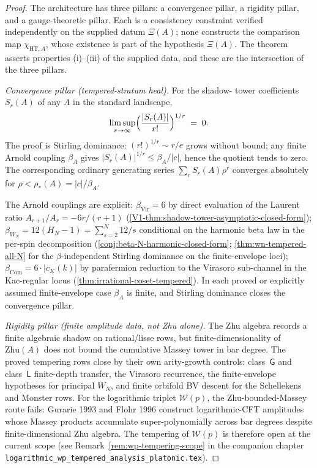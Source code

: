 \begin{proof}
The architecture has three pillars: a convergence pillar, a
rigidity pillar, and a gauge-theoretic pillar. Each is a consistency
constraint verified independently on the supplied datum \(\Xi(A)\);
none constructs the comparison map \(\chi_{\mathrm{HT},A}\), whose
existence is part of the hypothesis \(\Xi(A)\). The theorem asserts
properties (i)--(iii) of the supplied data, and these are the
intersection of the three pillars.

\emph{Convergence pillar (tempered-stratum heal).} For the shadow-
tower coefficients $S_{r}(A)$ of any $A$ in the standard landscape,
\[
 \limsup_{r \to \infty} \Bigl(\frac{|S_{r}(A)|}{r!}\Bigr)^{1/r}
 \;=\; 0.
\]
The proof is Stirling dominance:
$(r!)^{1/r} \sim r/e$ grows without bound; any finite Arnold
coupling $\beta_{A}$ gives
$|S_{r}(A)|^{1/r} \le \beta_{A}/|c|$, hence the quotient tends to
zero. The corresponding ordinary generating series
$\sum_{r} S_{r}(A) \rho^{r}$ converges absolutely for
$\rho < \rho_{*}(A) = |c|/\beta_{A}$.

The Arnold couplings are explicit:
$\beta_{\mathrm{Vir}} = 6$ by direct evaluation of the Laurent
ratio $A_{r+1}/A_{r} = -6r/(r+1)$
(\cref{V1-thm:shadow-tower-asymptotic-closed-form});
$\beta_{W_{N}} = 12(H_{N} - 1) = \sum_{s=2}^{N} 12/s$
conditional on the harmonic beta law in the per-spin decomposition
(\cref{conj:beta-N-harmonic-closed-form};
\cref{thm:wn-tempered-all-N} for the $\beta$-independent Stirling
dominance on the finite-envelope loci);
$\beta_{\mathrm{Com}} = 6 \cdot |c_{K}(k)|$ by parafermion
reduction to the Virasoro sub-channel in the Kac-regular locus
(\cref{thm:irrational-coset-tempered}). In each proved or explicitly
assumed finite-envelope case $\beta_{A}$ is finite, and Stirling
dominance closes the convergence pillar.

\emph{Rigidity pillar (finite amplitude data, not Zhu alone).}
The Zhu algebra records a finite algebraic shadow on rational/lisse
rows, but finite-dimensionality of $\mathrm{Zhu}(A)$ does not bound
the cumulative Massey tower in bar degree.  The proved tempering
rows close by their own arity-growth controls: class~$\mathsf G$ and
class~$\mathsf L$ finite-depth transfer, the Virasoro recurrence,
the finite-envelope hypotheses for principal $W_N$, and finite
orbifold BV descent for the Schellekens and Monster rows.  For the
logarithmic triplet $\mathcal{W}(p)$, the Zhu-bounded-Massey route
fails: Gurarie 1993 and Flohr 1996 construct logarithmic-CFT
amplitudes whose Massey products accumulate super-polynomially
across bar degrees despite finite-dimensional Zhu algebra.  The
tempering of $\mathcal{W}(p)$ is therefore open at the current scope
(see
Remark~\ref{rem:wp-tempering-scope} in the companion chapter
\texttt{logarithmic\_wp\_tempered\_analysis\_platonic.tex}).


\end{proof}
